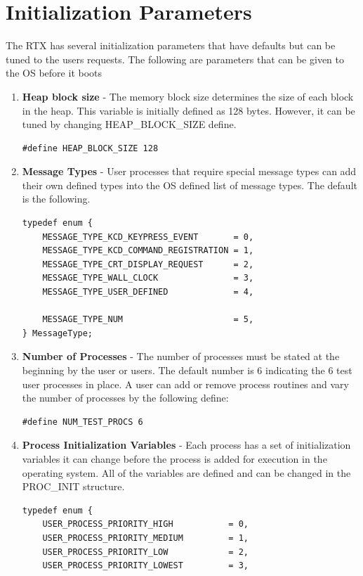 \documentclass[12pt,twocolumn]{report}
\begin{document}
\section{Initialization Parameters}
The RTX has several initialization parameters that have defaults but can be tuned to the users requests. The following are parameters that can be given to the OS before it boots
\begin{enumerate}
    \item { \bf Heap block size }- The memory block size determines the size of each block in the heap. This variable is initially defined as 128 bytes. However, it can be tuned by changing HEAP\_BLOCK\_SIZE define.
\begin{lstlisting}
#define HEAP_BLOCK_SIZE 128
\end{lstlisting}

    \item { \bf Message Types }- User processes that require special message types can add their own defined types into the OS defined list of message types. The default is the following.
\begin{lstlisting}
typedef enum {
    MESSAGE_TYPE_KCD_KEYPRESS_EVENT       = 0,
    MESSAGE_TYPE_KCD_COMMAND_REGISTRATION = 1,
    MESSAGE_TYPE_CRT_DISPLAY_REQUEST      = 2,
    MESSAGE_TYPE_WALL_CLOCK               = 3,
    MESSAGE_TYPE_USER_DEFINED             = 4,

    MESSAGE_TYPE_NUM                      = 5,
} MessageType;
\end{lstlisting}

    \item { \bf Number of Processes }- The number of processes must be stated at the beginning by the user or users. The default number is 6 indicating the 6 test user processes in place. A user can add or remove process routines and vary the number of processes by the following define:
\begin{lstlisting}
#define NUM_TEST_PROCS 6
\end{lstlisting}

    \item { \bf Process Initialization Variables }- Each process has a set of initialization variables it can change before the process is added for execution in the operating system. All of the variables are defined and can be changed in the PROC\_INIT structure.
\begin{lstlisting}
typedef enum {
    USER_PROCESS_PRIORITY_HIGH           = 0,
    USER_PROCESS_PRIORITY_MEDIUM         = 1,
    USER_PROCESS_PRIORITY_LOW            = 2,
    USER_PROCESS_PRIORITY_LOWEST         = 3,


\end{lstlisting}
\end{enumerate}
\end{document}
